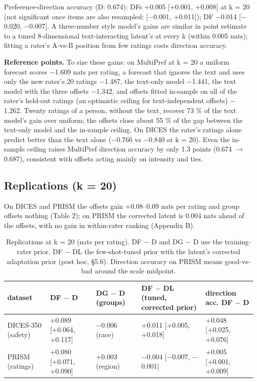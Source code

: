 \documentclass{article}
\begin{document}
Preference-direction accuracy (D: 0.674): DFs +0.005 {[}+0.001, +0.008{]} at k = 20 (not significant once items are also resampled: {[}$-$0.001, +0.011{]}); DF $-$0.014 {[}$-$0.020, $-$0.007{]}. A three-number style model's gains are similar in point estimate to a tuned 8-dimensional text-interacting latent's at every k (within 0.005 nats); fitting a rater's A-vs-B position from few ratings costs direction accuracy.

\textbf{Reference points.} To size these gains: on MultiPref at k = 20 a uniform forecast scores $-$1.609 nats per rating, a forecast that ignores the text and uses only the new rater's 20 ratings $-$1.487, the text-only model $-$1.441, the text model with the three offsets $-$1.342, and offsets fitted in-sample on all of the rater's held-out ratings (an optimistic ceiling for text-independent offsets) $-$1.262. Twenty ratings of a person, without the text, recover 73 \% of the text model's gain over uniform; the offsets close about 55 \% of the gap between the text-only model and the in-sample ceiling. On DICES the rater's ratings alone predict better than the text alone ($-$0.766 vs $-$0.840 at k = 20). Even the in-sample ceiling raises MultiPref direction accuracy by only 1.3 points (0.674 $\to$ 0.687), consistent with offsets acting mainly on intensity and ties.

\subsection{Replications (k = 20)}

On DICES and PRISM the offsets gain +0.08--0.09 nats per rating and group offsets nothing (Table 2); on PRISM the corrected latent is 0.004 nats ahead of the offsets, with no gain in within-rater ranking (Appendix B).

\begin{table}[t]\centering\caption{Replications at k = 20 (nats per rating). DF $-$ D and DG $-$ D use the training-rater prior, DF $-$ DL the few-shot-tuned prior with the latent's corrected adaptation prior (post hoc, \S{}5.6). Direction accuracy on PRISM means good-vs-bad around the scale midpoint.}\scriptsize\setlength{\tabcolsep}{3pt}\begin{tabular}{@{}
  l
  l
  l
  l
  l@{}}
\toprule\noalign{}
dataset & DF $-$ D & DG $-$ D (groups) & DF $-$ DL (tuned, corrected prior) & direction acc. DF $-$ D \\
\midrule\noalign{}



DICES-350 (safety) & +0.089 {[}+0.064, +0.117{]} & $-$0.006 (race) & +0.011 {[}+0.005, +0.018{]} & +0.048 {[}+0.025, +0.076{]} \\
PRISM (ratings) & +0.080 {[}+0.071, +0.090{]} & +0.003 (region) & $-$0.004 {[}$-$0.007, $-$0.001{]} & +0.005 {[}+0.001, +0.009{]} \\
\bottomrule
\end{tabular}\end{table}
\end{document}
